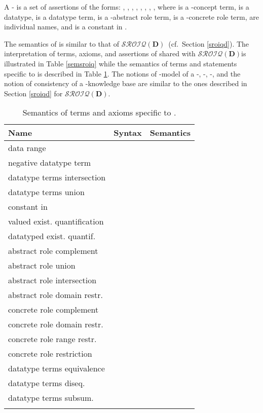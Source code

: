 \documentclass[a4paper]{llncs}
\newcommand{\sroiqd}{\ensuremath{\mathcal{SROIQ}(\D)}}
\newcommand{\D}{\mathbf{D}}
\begin{document}
A - is a set of assertions of the forms: , , , , , , , , where  is a -concept term,  is a datatype,  is a datatype term,  is a -abstract role term,  is a -concrete role term,  are individual names, and  is a constant in .

The semantics of  is similar to that of \sroiqd\ (cf.\  Section \ref{sroiqd}). The interpretation of terms, axioms, and assertions of  shared with \sroiqd\space is illustrated in Table \ref{semsroiq} while the semantics of terms and statements specific to  is described in Table \ref{semdlss}. The notions of -model of a -, -, -, and the notion of consistency of a -knowledge base are similar to the ones described in Section \ref{sroiqd} for \sroiqd.
{\small
\begin{longtable}{|>{\centering}m{4cm}|c|c|}
\hline
Name & Syntax & Semantics \\
\hline

data range  &  &  \\

negative datatype term &  &  \\

datatype terms intersection &  &  \\

datatype terms union &  &  \\

constant in  &  &  \\

\hline

valued exist. quantification &  &  \\

datatyped exist. quantif. &  &  \\

\hline

abstract role complement &  & \\

abstract role union &  & \\

abstract role intersection &  & \\

abstract role domain restr. &  & \\

concrete role complement &  & \\

concrete role domain restr. &  & \\

concrete role range restr. &  &  \\

concrete role restriction &  &  \\

\hline

datatype terms equivalence &  & \\

datatype terms diseq. &  & \\

datatype terms subsum. &  &   \\

\hline \caption{Semantics of terms and axioms specific to .} \label{semdlss}
\end{longtable}
}
\end{document}

